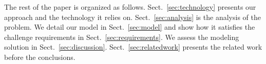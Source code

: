 

The rest of the paper is organized as follows. Sect.~\ref{sec:technology}
presents our approach and the technology it relies on. Sect.~\ref{sec:analysis}
is the analysis of the problem. We detail our model in Sect.~\ref{sec:model}
and show how it satisfies the challenge requirements in
Sect.~\ref{sec:requirements}. We assess the modeling solution in
Sect.~\ref{sec:discussion}. Sect.~\ref{sec:relatedwork} presents the related work before the conclusions.%






